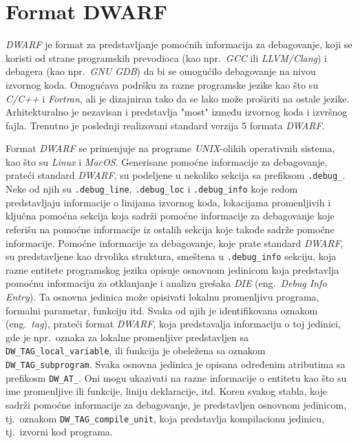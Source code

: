 \documentclass[12pt,oneside]{memoir}
\begin{document}
\section{Format DWARF}

\emph{DWARF} je format za predstavljanje pomoćnih informacija za debagovanje, koji se koristi od strane programskih prevodioca (kao npr.~\emph{GCC} ili \emph{LLVM/Clang}) i debagera (kao npr.~\emph{GNU GDB}) da bi se omogućilo debagovanje na nivou izvornog koda. Omogućava podršku za razne programske jezike kao što su \emph{C/C++} i \emph{Fortran}, ali je dizajniran tako da se lako može proširiti na ostale jezike. Arhitekturalno je nezavisan i predstavlja "most" između izvornog koda i izvršnog fajla. Trenutno je poslednji realizovani standard verzija 5 formata \emph{DWARF}.

Format \emph{DWARF} se primenjuje na programe \emph{UNIX}-olikih operativnih sistema, kao što su \emph{Linux} i \emph{MacOS}. Generisane pomoćne informacije za debagovanje, prateći standard \emph{DWARF}, su podeljene u nekoliko sekcija sa prefiksom \texttt{.debug\_}. Neke od njih su \texttt{.debug\_line}, \texttt{.debug\_loc} i \texttt{.debug\_info} koje redom predstavljaju informacije o linijama izvornog koda, lokacijama promenljivih i ključna pomoćna sekcija koja sadrži pomoćne informacije za debagovanje koje referišu na pomoćne informacije iz ostalih sekcija koje takođe sadrže pomoćne informacije.
Pomoćne informacije za debagovanje, koje prate standard \emph{DWARF}, su predstavljene kao drvolika struktura, smeštena u \texttt{.debug\_info} sekciju,  koja razne entitete programskog jezika opisuje osnovnom jedinicom koja predstavlja pomoćnu informaciju za otklanjanje i analizu grešaka \emph{DIE} (eng.~\emph{Debug Info Entry}). Ta osnovna jedinica može opisivati lokalnu promenljivu programa, formalni parametar, funkciju itd. Svaka od njih je identifikovana oznakom (eng.~\emph{tag}), prateći format \emph{DWARF}, koja predstavalja informaciju o toj jedinici, gde je npr.~oznaka za lokalne promenljive predstavljen sa \texttt{DW\_TAG\_local\_variable}, ili funkcija je obeležena sa oznakom \texttt{DW\_TAG\_subprogram}. Svaka osnovna jedinica je opisana određenim atributima sa prefikosm \texttt{DW\_AT\_}. Oni mogu ukazivati na razne informacije o entitetu kao što su ime promenljive ili funkcije, liniju deklaracije, itd. Koren svakog stabla, koje sadrži pomoćne informacije za debagovanje, je predstavljen osnovnom jedinicom, tj.~oznakom \texttt{DW\_TAG\_compile\_unit}, koja predstavlja kompilacionu jedinicu, tj.~izvorni kod programa.\newpage
\end{document}
